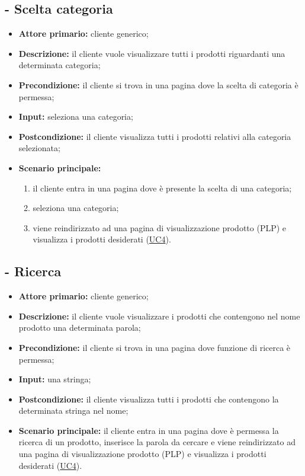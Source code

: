 \subsection{ - Scelta categoria}
\begin{itemize}
    \item \textbf{Attore primario:} cliente generico;
    \item \textbf{Descrizione:} il cliente vuole visualizzare tutti i prodotti riguardanti una determinata categoria;
    \item \textbf{Precondizione:} il cliente si trova in una pagina dove la scelta di categoria è permessa;
    \item \textbf{Input:} seleziona una categoria;
    \item \textbf{Postcondizione:} il cliente visualizza tutti i prodotti relativi alla categoria selezionata;
    \item \textbf{Scenario principale:}
          \begin{enumerate}
              \item il cliente entra in una pagina dove è presente la scelta di una categoria;
              \item seleziona una categoria;
              \item viene reindirizzato ad una pagina di visualizzazione prodotto (PLP) e visualizza i prodotti desiderati (\hyperref[UC4]{UC4}).
          \end{enumerate}
\end{itemize}

\stepUserCase
\subsection{ - Ricerca}
\begin{itemize}
    \item \textbf{Attore primario:} cliente generico;
    \item \textbf{Descrizione:} il cliente vuole visualizzare i prodotti che contengono nel nome prodotto una determinata parola;
    \item \textbf{Precondizione:} il cliente si trova in una pagina dove funzione di ricerca è permessa;
    \item \textbf{Input:} una stringa;
    \item \textbf{Postcondizione:} il cliente visualizza tutti i prodotti che contengono la determinata stringa nel nome;
    \item \textbf{Scenario principale:} il cliente entra in una pagina dove è permessa la ricerca di un prodotto, inserisce la parola da cercare e viene reindirizzato ad una pagina di visualizzazione prodotto (PLP) e visualizza i prodotti desiderati (\hyperref[UC4]{UC4}).
\end{itemize}

